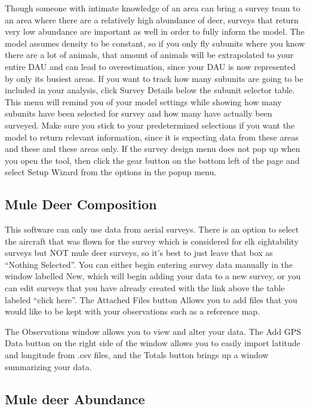 \documentclass[
]{book}
\begin{document}
Though someone with intimate knowledge of an area can bring a survey team to an area where there are a relatively high abundance of deer, surveys that return very low abundance are important as well in order to fully inform the model. The model assumes density to be constant, so if you only fly subunits where you know there are a lot of animals, that amount of animals will be extrapolated to your entire DAU and can lead to overestimation, since your DAU is now represented by only its busiest areas. If you want to track how many subunits are going to be included in your analysis, click {Survey Details} below the subunit selector table. This menu will remind you of your model settings while showing how many subunits have been selected for survey and how many have actually been surveyed. Make sure you stick to your predetermined selections if you want the model to return relevant information, since it is expecting data from these areas and these and these areas only. If the survey design menu does not pop up when you open the tool, then click the gear button on the bottom left of the page and select Setup Wizard from the options in the popup menu.

\hypertarget{de-mdcomp}{%
\subsection{Mule Deer Composition}\label{de-mdcomp}}

This software can only use data from aerial surveys. There is an option to select the aircraft that was flown for the survey which is considered for elk sightability surveys but NOT mule deer surveys, so it's best to just leave that box as ``Nothing Selected''. You can either begin entering survey data manually in the window labelled New, which will begin adding your data to a new survey, or you can edit surveys that you have already created with the link above the table labeled ``click here''. The Attached Files button Allows you to add files that you would like to be kept with your observations such as a reference map.

The Observations window allows you to view and alter your data. The Add GPS Data button on the right side of the window allows you to easily import latitude and longitude from .csv files, and the Totals button brings up a window summarizing your data.

\hypertarget{de-mdabun}{%
\subsection{Mule deer Abundance}\label{de-mdabun}}
\end{document}
